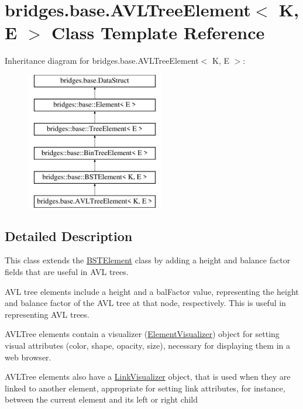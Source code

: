 \hypertarget{classbridges_1_1base_1_1_a_v_l_tree_element}{}\section{bridges.\+base.\+A\+V\+L\+Tree\+Element$<$ K, E $>$ Class Template Reference}
\label{classbridges_1_1base_1_1_a_v_l_tree_element}
Inheritance diagram for bridges.\+base.\+A\+V\+L\+Tree\+Element$<$ K, E $>$\+:\begin{figure}[H]
\begin{center}
\leavevmode
\includegraphics[height=6.000000cm]{classbridges_1_1base_1_1_a_v_l_tree_element}
\end{center}
\end{figure}


\subsection{Detailed Description}
This class extends the \mbox{\hyperlink{classbridges_1_1base_1_1_b_s_t_element}{B\+S\+T\+Element}} class by adding a height and balance factor fields that are useful in A\+VL trees. 

A\+VL tree elements include a \textquotesingle{}height\textquotesingle{} and a \textquotesingle{}bal\+Factor\textquotesingle{} value, representing the height and balance factor of the A\+VL tree at that node, respectively. This is useful in representing A\+VL trees.

A\+V\+L\+Tree elements contain a visualizer (\mbox{\hyperlink{classbridges_1_1base_1_1_element_visualizer}{Element\+Visualizer}}) object for setting visual attributes (color, shape, opacity, size), necessary for displaying them in a web browser.

A\+V\+L\+Tree elements also have a \mbox{\hyperlink{classbridges_1_1base_1_1_link_visualizer}{Link\+Visualizer}} object, that is used when they are linked to another element, appropriate for setting link attributes, for instance, between the current element and its left or right child

